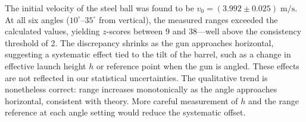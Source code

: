 \documentclass[12pt]{article}
\begin{document}
The initial velocity of the steel ball was found to be $v_0 = (3.992 \pm 0.025)\;\mathrm{m/s}$. At all six angles ($10^\circ$--$35^\circ$ from vertical), the measured ranges exceeded the calculated values, yielding $z$-scores between 9 and 38---well above the consistency threshold of 2. The discrepancy shrinks as the gun approaches horizontal, suggesting a systematic effect tied to the tilt of the barrel, such as a change in effective launch height $h$ or reference point when the gun is angled. These effects are not reflected in our statistical uncertainties. The qualitative trend is nonetheless correct: range increases monotonically as the angle approaches horizontal, consistent with theory. More careful measurement of $h$ and the range reference at each angle setting would reduce the systematic offset.
\end{document}
